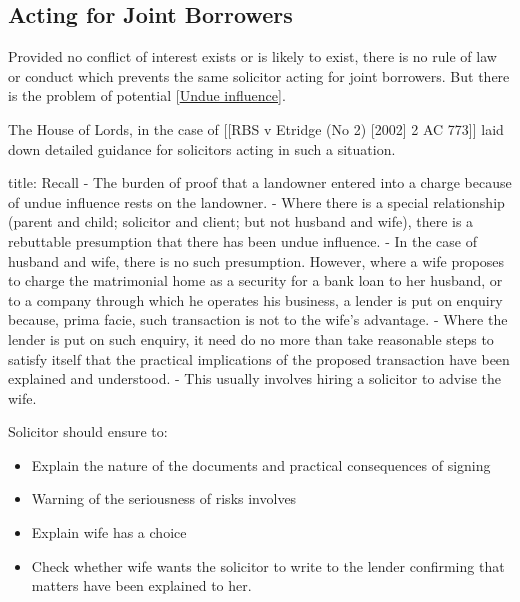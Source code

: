 \documentclass[
]{article}
\newenvironment{Shaded}{}{}
\newcommand{\NormalTok}[1]{#1}
\providecommand{\tightlist}{%
  \setlength{\itemsep}{0pt}\setlength{\parskip}{0pt}}
\begin{document}
\hypertarget{acting-for-joint-borrowers}{%
\subsection{Acting for Joint
Borrowers}\label{acting-for-joint-borrowers}}

Provided no conflict of interest exists or is likely to exist, there is
no rule of law or conduct which prevents the same solicitor acting for
joint borrowers. But there is the problem of potential
{[}\protect\hyperlink{undue-influence}{Undue influence}{]}.

The House of Lords, in the case of {[}{[}RBS v Etridge (No 2) {[}2002{]}
2 AC 773{]}{]} laid down detailed guidance for solicitors acting in such
a situation.

\begin{Shaded}
\begin{Highlighting}[]
\NormalTok{title: Recall}
\NormalTok{{-} The burden of proof that a landowner entered into a charge because of undue influence rests on the landowner.}
\NormalTok{{-} Where there is a special relationship (parent and child; solicitor and client; but not husband and wife), there is a rebuttable presumption that there has been undue influence.}
\NormalTok{{-} In the case of husband and wife, there is no such presumption. However, where a wife proposes to charge the matrimonial home as a security for a bank loan to her husband, or to a company through which he operates his business, a lender is put on enquiry because, prima facie, such transaction is not to the wife’s advantage.}
\NormalTok{{-} Where the lender is put on such enquiry, it need do no more than take reasonable steps to satisfy itself that the practical implications of the proposed transaction have been explained and understood. }
\NormalTok{{-} This usually involves hiring a solicitor to advise the wife. }
\end{Highlighting}
\end{Shaded}

Solicitor should ensure to:

\begin{itemize}
\tightlist
\item
  Explain the nature of the documents and practical consequences of
  signing
\item
  Warning of the seriousness of risks involves
\item
  Explain wife has a choice
\item
  Check whether wife wants the solicitor to write to the lender
  confirming that matters have been explained to her.
\end{itemize}
\end{document}
